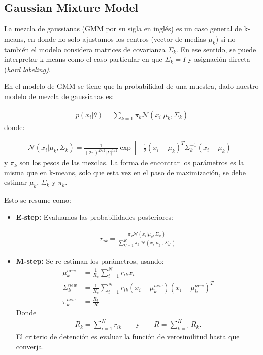 \subsection{Gaussian Mixture Model}

La mezcla de gaussianas (GMM por su sigla en inglés) es un caso general de k-means, en donde no solo ajustamos los centros (vector de medias $\mu_k$) si no también el modelo considera matrices de covarianza $\Sigma_k$. En ese sentido, se puede interpretar k-means como el caso particular en que $\Sigma_k = I$ y asignación directa (\emph{hard labeling)}.

En el modelo de GMM se tiene que la probabilidad de una muestra, dado nuestro modelo de mezcla de gaussianas es:

\begin{align}
p(x_i|\theta) = \sum_{k=1} \pi_k \mathcal{N}(x_i| \mu_k,\Sigma_k)
\end{align}
donde:

\begin{align}
\mathcal{N}(x_i| \mu_k,\Sigma_k) = \frac{1}{(2\pi)^{D/2}|\Sigma|^{1/2}}\exp \left[ -\frac{1}{2}(x_i-\mu_k)^T \Sigma_k^{-1}(x_i-\mu_k) \right]
\end{align}
y $\pi_k$ son los pesos de las mezclas. La forma de encontrar los parámetros es la misma que en k-means, solo que esta vez en el paso de maximización, se debe estimar $\mu_k$, $\Sigma_k$ y $\pi_k$.

Esto se resume como:

\begin{itemize}
    \item \textbf{E-step:} Evaluamos las probabilidades posteriores:
    
    \begin{align}
    r_{ik} = \frac{\pi_k \mathcal{N}(x_i| \mu_k,\Sigma_k)}{\sum_{k'=1}^K \pi_{k'}\mathcal{N}(x_i| \mu_{k'},\Sigma_{k'})}
    \end{align}
    \item \textbf{M-step:} Se re-estiman los parámetros, usando:
    \begin{align}
    \mu_k^{new} & = \frac{1}{R_k}\sum_{i=1}^N r_{ik}x_i\\
    \Sigma_k^{new} & = \frac{1}{R_k} \sum_{i=1}^N r_{ik}(x_i - \mu_k^{new})(x_i - \mu_k^{new})^T\\
    \pi_k^{new} & = \frac{R_k}{R}
    \end{align}
    Donde
    \begin{align*}
    R_k = \sum_{i=1}^N r_{ik} \qquad \text{y} \qquad R = \sum_{k=1}^K R_k.
    \end{align*}
    El criterio de detención es evaluar la función de verosimilitud hasta que converja.
\end{itemize}

